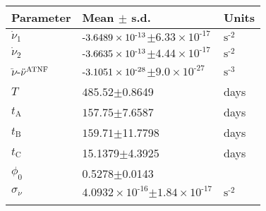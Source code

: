 \begin{tabular}{lll} \hhline{===}
        Parameter & Mean $\pm$ s.d. &  Units\\ \hline
$\dot{\nu}_{1}$ & ${\text{\textrm{-}}3.6489}\times 10^{\textrm{-}13}$$\pm$${6.33}\times 10^{\textrm{-}17}$ & $\mathrm{s}^{\textrm{-}2}$\\
$\dot{\nu}_{2}$ & ${\text{\textrm{-}}3.6635}\times 10^{\textrm{-}13}$$\pm$${4.44}\times 10^{\textrm{-}17}$ & $\mathrm{s}^{\textrm{-}2}$\\
$\ddot{\nu}$\textrm{-}$\ddot{\nu}^{\tiny\mathrm{ATNF}}$
 & ${\text{\textrm{-}}3.1051}\times 10^{\textrm{-}28}$$\pm$${9.0}\times 10^{\textrm{-}27}$ & $\mathrm{s}^{\textrm{-}3}$\\
$T$ & $485.52$$\pm$0.8649 & days\\
$t_\mathrm{A}$ & $157.75$$\pm$7.6587 & days\\
$t_\mathrm{B}$ & $159.71$$\pm$11.7798 & days\\
$t_\mathrm{C}$ & 15.1379$\pm$4.3925 & days\\
$\phi_{0}$ & 0.5278$\pm$0.0143 & \\
$\sigma_{\dot{\nu}}$ & ${4.0932}\times 10^{\textrm{-}16}$$\pm$${1.84}\times 10^{\textrm{-}17}$ & $\mathrm{s}^{\textrm{-}2}$\\
\hhline{===}
\end{tabular}